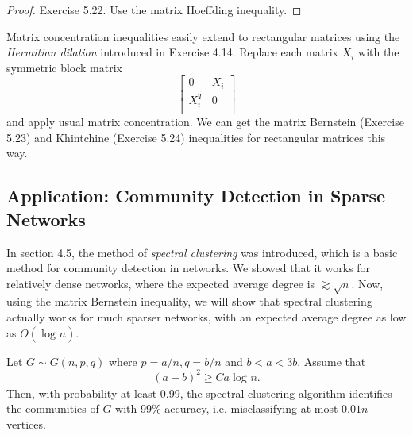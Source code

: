 \begin{proof}
Exercise 5.22. Use the matrix Hoeffding inequality.
\end{proof}

\begin{remark}
\label{rmk:5.4.15}
Matrix concentration inequalities easily extend to rectangular matrices using the \textit{Hermitian dilation} 
introduced in Exercise 4.14. Replace each matrix $X_i$ with the symmetric block matrix 
\[ \begin{bmatrix}
0 & X_i \\
X_i^T & 0 \\
\end{bmatrix} \]
and apply usual matrix concentration. We can get the matrix Bernstein (Exercise 5.23) and Khintchine (Exercise 
5.24) inequalities for rectangular matrices this way.
\end{remark}



\subsection{Application: Community Detection in Sparse Networks}
In section 4.5, the method of \textit{spectral clustering} was introduced, which is a basic method for 
community detection in networks. We showed that it works for relatively dense networks, where the expected 
average degree is $\gtrsim \sqrt{n}$. Now, using the matrix Bernstein inequality, we will show that spectral 
clustering actually works for much sparser networks, with an expected average degree as low as $O(\log_{}{n})$.

\begin{theorem}
\label{thm:5.5.1}
Let $G \sim G(n, p, q)$ where $p = a/n, q = b/n$ and $b < a < 3b$. Assume that 
\[ (a - b)^2 \geq Ca \log_{}{n}. \]
Then, with probability at least 0.99, the spectral clustering algorithm identifies the communities of $G$ 
with 99\% accuracy, i.e. misclassifying at most $0.01n$ vertices.
\end{theorem}

